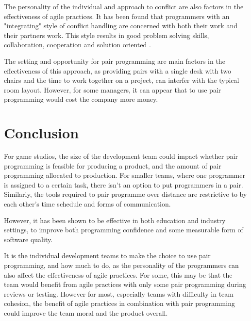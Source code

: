 \documentclass{scrartcl}
\begin{document}
The personality of the individual and approach to conflict are also factors in the effectiveness of agile practices. It has been found that programmers with an "integrating" style of conflict handling are concerned with both their work and their partners work. This style results in good problem solving skills, collaboration, cooperation and solution oriented \cite{Domino:2003}.

The setting and opportunity for pair programming are main factors in the effectiveness of this approach, as providing pairs with a single desk with two chairs and the time to work together on a project, can interfer with the typical room layout. However, for some managers, it can appear that to use pair programming would cost the company more money.

\section*{Conclusion}
For game studios, the size of the development team could impact whether pair programming is feasible for producing a product, and the amount of pair programming allocated to production. For smaller teams, where one programmer is assigned to a certain task, there isn't an option to put programmers in a pair. Similarly, the tools required to pair programme over distance are restrictive to by each other's time schedule and forms of communication.

However, it has been shown to be effective in both education and industry settings, to improve both programming confidence and some measurable form of software quality.

It is the individual development teams to make the choice to use pair programming, and how much to do, as the personality of the programmers can also affect the effectiveness of agile practices. For some, this may be that the team would benefit from agile practices with only some pair programming during reviews or testing. However for most, especially teams with difficulty in team cohesion, the benefit of agile practices in combination with pair programming could improve the team moral and the product overall.



\end{document}
